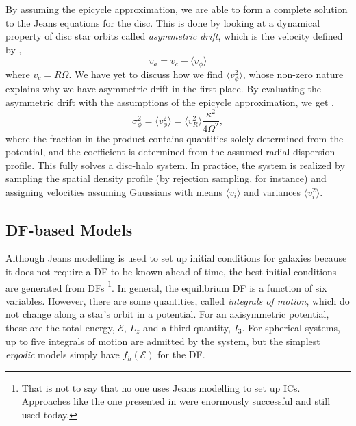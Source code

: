 By assuming the epicycle approximation, we are able to form a complete solution to the Jeans equations for the disc. This is done by looking at a dynamical property of disc star orbits called \textit{asymmetric drift}, which is the velocity defined by \citep{BT},
\begin{equation}
v_a = v_c -  \langle v_\phi \rangle
\end{equation}
where $v_c = R \Omega$. We have yet to discuss how we find $\langle v_\phi^2 \rangle$, whose non-zero nature explains why we have asymmetric drift in the first place. By evaluating the asymmetric drift with the assumptions of the epicycle approximation, we get \citep{hernquist_1993},
\begin{equation}
\sigma_\phi^2 = \langle v_\phi^2 \rangle = \langle v_R^2 \rangle \frac{\kappa^2}{4 \Omega^2},
\end{equation}
where the fraction in the product contains quantities solely determined from the potential, and the coefficient is determined from the assumed radial dispersion profile. This fully solves a disc-halo system. In practice, the system is realized by sampling the spatial density profile (by rejection sampling, for instance) and assigning velocities assuming Gaussians with means $\langle v_i \rangle$ and variances $\langle v_i^2 \rangle$. 

\subsection{DF-based Models}

Although Jeans modelling is used to set up initial conditions for galaxies because it does not require a DF to be known ahead of time, the best initial conditions are generated from DFs \footnote{That is not to say that no one uses Jeans modelling to set up ICs. Approaches like the one presented in \citet{hernquist_1993} were enormously successful and still used today.}. In general, the equilibrium DF is a function of six variables. However, there are some quantities, called \textit{integrals of motion}, which do not change along a star's orbit in a potential. For an axisymmetric potential, these are the total energy, $\mathcal{E}$, $L_z$ and a third quantity, $I_3$.  
For spherical systems, up to five integrals of motion are admitted by the system, but the simplest \textit{ergodic} models simply have $f_{h}(\mathcal{E})$ for the DF. 


